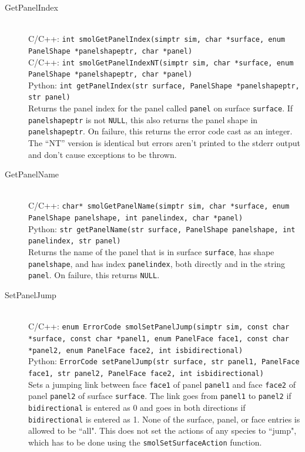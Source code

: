 \documentclass {book}
\newcommand {\ttt} {\texttt}
\begin{document}
\begin{description}
\item[GetPanelIndex]
\hfill \\
C/C++: \ttt{int smolGetPanelIndex(simptr sim, char *surface, enum PanelShape *panelshapeptr, char *panel)}\\
C/C++: \ttt{int smolGetPanelIndexNT(simptr sim, char *surface, enum PanelShape *panelshapeptr, char *panel)}\\
Python: \ttt{int getPanelIndex(str surface, PanelShape *panelshapeptr, str panel)}\\
Returns the panel index for the panel called \ttt{panel} on surface \ttt{surface}. If \ttt{panelshapeptr} is not \ttt{NULL}, this also returns the panel shape in \ttt{panelshapeptr}. On failure, this returns the error code cast as an integer. The ``NT'' version is identical but errors aren't printed to the stderr output and don't cause exceptions to be thrown.

\item[GetPanelName]
\hfill \\
C/C++: \ttt{char* smolGetPanelName(simptr sim, char *surface, enum PanelShape panelshape, int panelindex, char *panel)}\\
Python: \ttt{str getPanelName(str surface, PanelShape panelshape, int panelindex, str panel)}\\
Returns the name of the panel that is in surface \ttt{surface}, has shape \ttt{panelshape}, and has index \ttt{panelindex}, both directly and in the string \ttt{panel}. On failure, this returns \ttt{NULL}.

\item[SetPanelJump]
\hfill \\
C/C++: \ttt{enum ErrorCode smolSetPanelJump(simptr sim, const char *surface, const char *panel1, enum PanelFace face1, const char *panel2, enum PanelFace face2, int isbidirectional)}\\
Python: \ttt{ErrorCode setPanelJump(str surface, str panel1, PanelFace face1, str panel2, PanelFace face2, int isbidirectional)}\\
Sets a jumping link between face \ttt{face1} of panel \ttt{panel1} and face \ttt{face2} of panel \ttt{panel2} of surface \ttt{surface}. The link goes from \ttt{panel1} to \ttt{panel2} if \ttt{bidirectional} is entered as 0 and goes in both directions if \ttt{bidirectional} is entered as 1. None of the surface, panel, or face entries is allowed to be ``all". This does not set the actions of any species to ``jump", which has to be done using the \ttt{smolSetSurfaceAction} function.


\end{description}
\end{document}
